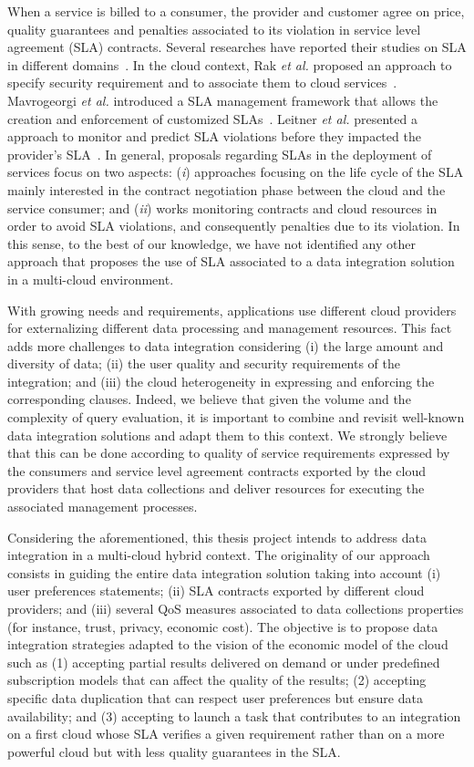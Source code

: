 \documentclass[11pt,a4paper,oneside]{report}
\begin{document}
When a service is billed to a consumer, the provider and customer agree on price, quality guarantees and penalties associated to its violation in service level agreement (SLA) contracts. Several researches have reported their studies on SLA in different domains~\cite{AlhamadDC11}. In the cloud context, Rak \textit{et al.} proposed an approach to specify security requirement and to associate them to cloud services~\cite{rak2013}. Mavrogeorgi \textit{et al.} introduced a SLA management framework that allows the creation and enforcement of customized SLAs~\cite{Mavrogeorgi2013}. Leitner \textit{et al.} presented a approach to monitor and predict SLA violations before they impacted the provider's SLA~\cite{Leitner2010}. In general, proposals regarding SLAs in the deployment of services focus on two aspects: (\textit{i}) approaches focusing on the life cycle of the SLA mainly interested in the contract negotiation phase between the cloud and the service consumer; and (\textit{ii}) works monitoring contracts and cloud resources in order to avoid SLA violations, and consequently penalties due to its violation. In this sense, to the best of our knowledge, we have not identified any other approach that proposes the use of SLA associated to a data integration solution in a multi-cloud environment.

With growing needs and requirements, applications use different cloud providers for externalizing different data processing and management resources. This fact adds more challenges to data integration considering (i) the large amount and diversity of data; (ii) the user quality and security requirements of the integration; and (iii) the cloud heterogeneity in expressing and enforcing the corresponding clauses. Indeed, we believe that given the volume and the complexity of query evaluation, it is important to combine and revisit well-known data integration solutions and adapt them to this context. We strongly believe that this can be done according to quality of service requirements expressed by the consumers and service level agreement contracts exported by the cloud providers that host data collections and deliver resources for executing the associated management processes.

Considering the aforementioned, this thesis project intends to address data integration in a multi-cloud hybrid context. The originality of our approach consists in guiding the entire data integration solution taking into account (i) user preferences statements; (ii) SLA contracts exported by different cloud providers; and (iii) several QoS measures associated to data collections properties (for instance, trust, privacy, economic cost). The objective is to propose data integration strategies adapted to the vision of the economic model of the cloud such as (1) accepting partial results delivered on demand or under predefined subscription models that can affect the quality of the results; (2) accepting specific data duplication that can respect user preferences but ensure data availability; and (3) accepting to launch a task that contributes to an integration on a first cloud whose SLA verifies a given requirement rather than on a more powerful cloud but with less quality guarantees in the SLA.
\end{document}
